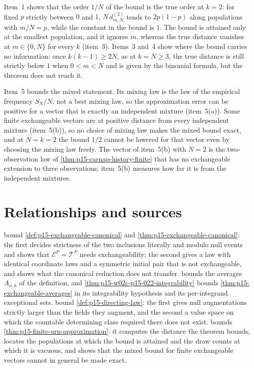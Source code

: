 Item~1 shows that the order \(1/N\) of the bound is the true order at
\(k=2\): for fixed \(p\) strictly between \(0\) and \(1\),
\(N\,d_{m,N}^{(2)}\) tends to \(2p(1-p)\) along populations with
\(m/N=p\), while the constant in the bound is \(1\). The bound is
attained only at the smallest population, and it ignores \(m\), whereas
the true distance vanishes at \(m\in\{0,N\}\) for every \(k\) (item~3).
Items~3 and~4 show where the bound carries no information: once
\(k(k-1)\geq2N\), as at \(k=N\geq3\), the true distance is still
strictly below \(1\) when \(0<m<N\) and is given by the binomial formula,
but the theorem does not reach it.

Item~5 bounds the mixed statement. Its mixing law is the law of the
empirical frequency \(S_N/N\), not a best mixing law, so the
approximation error can be positive for a vector that is exactly an
independent mixture (item~5(a)). Some finite exchangeable vectors are at
positive distance from every independent mixture (item~5(b)), so no
choice of mixing law makes the mixed bound exact, and at \(N=k=2\) the
bound \(1/2\) cannot be lowered for that vector even by choosing the
mixing law freely. The vector of item~5(b) with \(N=2\) is the
two-observation law of \cref{thm:p15-carnap-history-finite} that has no
exchangeable extension to three observations; item~5(b) measures how
far it is from the independent mixtures.

\section{Relationships and sources}
\label{sec:p15-w02c-p15-022-relationships}

bound \cref{def:p15-exchangeable-canonical} and
\cref{thm:p15-exchangeable-canonical}: the first decides strictness of the
two inclusions literally and modulo null events and shows that
\(\mathcal E^{P}=\mathcal T^{P}\) needs exchangeability; the second gives
a law with identical coordinate laws and a symmetric initial pair that is
not exchangeable, and shows what the canonical reduction does not
transfer.  bounds the averages
\(A_{n,k}\) of the definition, and
\cref{thm:p15-w02c-p15-022-integrability} bounds
\cref{thm:p15-exchangeable-averages} in its integrability hypothesis and
its per-integrand exceptional sets.
bound \cref{def:p15-directing-law}: the first gives null augmentations
strictly larger than the fields they augment, and the second a value space
on which the countable determining class required there does not exist.
 bounds
\cref{thm:p15-finite-urn-approximation}: it computes the distance the
theorem bounds, locates the populations at which the bound is attained
and the draw counts at which it is vacuous, and shows that the mixed bound
for finite exchangeable vectors cannot in general be made exact.

